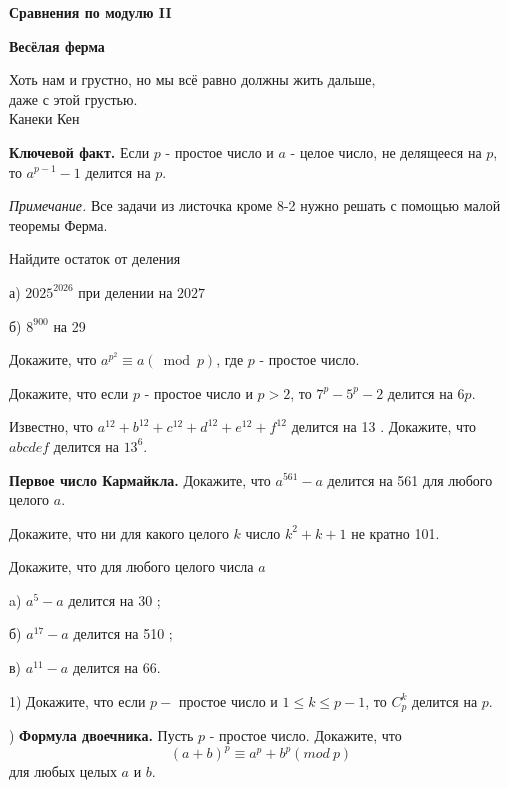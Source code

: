 \centerline{\bf \Huge Сравнения по модулю II}
\centerline{\bf \Huge Весёлая ферма}

\begin{flushright}
        \scriptsize{Хоть нам и грустно, но мы всё равно должны жить дальше,\\даже с этой грустью.\\ Канеки Кен}
\end{flushright}

\textbf{Ключевой факт.} Если $p$ - простое число и $a$ - целое число, не делящееся на $p$, то $a^{p-1}-1$ делится на $p$.

\textit{Примечание.} Все задачи из листочка кроме 8-2 нужно решать с помощью малой теоремы Ферма.

Найдите остаток от деления

а) $2025^{2026}$ при делении на $2027$

б) $8^{900}$ на 29 

Докажите, что $a^{p^2} \equiv a(\bmod p)$, где $p$ - простое число.

Докажите, что если $p$ - простое число и $p>2$, то $7^p-5^p-2$ делится на $6 p$.

Известно, что $a^{12}+b^{12}+c^{12}+d^{12}+e^{12}+f^{12}$ делится на 13 . Докажите, что $a b c d e f$ делится на $13^6$.

\textbf{Первое число Кармайкла.}
Докажите, что $a^{561}-a$ делится на 561 для любого целого $a$.

Докажите, что ни для какого целого $k$ число $k^2+k+1$ не кратно 101.

Докажите, что для любого целого числа $a$

a) $a^5-a$ делится на 30 ;

б) $a^{17}-a$ делится на 510 ;

в) $a^{11}-a$ делится на 66.

1) Докажите, что если $p-$ простое число и $1 \leq k \leq p-1$, то $C_p^k$ делится на $p$.

) \textbf{Формула двоечника.} Пусть $p$ - простое число. Докажите, что $$(a+b)^p \equiv a^p+b^p(mod \ p)$$ для любых целых $a$ и $b$.